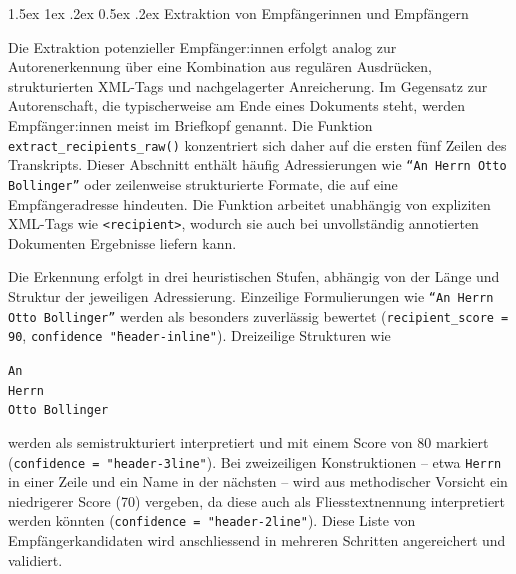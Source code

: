 \documentclass[12pt, a4paper, ngerman, bidi=default]{article}
\makeatletter
\newcommand{\code}[1]{\colorbox{VeryLightGray}{\texttt{#1}}} %
\let\oldparagraph\paragraph%
\renewcommand{\paragraph}{
    \@ifstar%
      \xxxParagraphStar%
      \xxxParagraphNoStar%
 }
\newcommand{\xxxParagraphStar}[1]{\oldparagraph*{#1}\mbox{}}
\newcommand{\xxxParagraphNoStar}[1]{\oldparagraph{#1}\mbox{}}
\renewcommand\paragraph{\@startsection{paragraph}{4}{0em}%
  {1.5ex \@plus1ex \@minus.2ex}%
  {0.5ex \@plus.2ex}%
  {\normalfont\normalsize\bfseries\itshape}}
\makeatother
\begin{document}
\paragraph{Extraktion von Empfängerinnen und Empfängern}

Die Extraktion potenzieller Empfänger:innen erfolgt analog zur Autorenerkennung über eine Kombination aus regulären Ausdrücken, strukturierten XML-Tags und nachgelagerter Anreicherung. Im Gegensatz zur Autorenschaft, die typischerweise am Ende eines Dokuments steht, werden Empfänger:innen meist im Briefkopf genannt. Die Funktion \code{extract\_recipients\_raw()} konzentriert sich daher auf die ersten fünf Zeilen des Transkripts. Dieser Abschnitt enthält häufig Adressierungen wie \texttt{\enquote{An Herrn Otto Bollinger}} oder zeilenweise strukturierte Formate, die auf eine Empfängeradresse hindeuten. Die Funktion arbeitet unabhängig von expliziten XML-Tags wie \code{<recipient>}, wodurch sie auch bei unvollständig annotierten Dokumenten Ergebnisse liefern kann.

Die Erkennung erfolgt in drei heuristischen Stufen, abhängig von der Länge und Struktur der jeweiligen Adressierung. Einzeilige Formulierungen wie \texttt{\enquote{An Herrn Otto Bollinger}} werden als besonders zuverlässig bewertet (\code{recipient\_score = 90}, \code{confidence \= "header-inline"}). Dreizeilige Strukturen wie 
\\ \begin{center}
\texttt{An\\Herrn\\Otto Bollinger}
\end{center}
\justifying werden als semistrukturiert interpretiert und mit einem Score von 80 markiert (\code{confidence = "header-3line"}). Bei zweizeiligen Konstruktionen – etwa \texttt{Herrn} in einer Zeile und ein Name in der nächsten – wird aus methodischer Vorsicht ein niedrigerer Score (70) vergeben, da diese auch als Fliesstextnennung interpretiert werden könnten (\code{confidence = "header-2line"}). Diese Liste von Empfängerkandidaten wird anschliessend in mehreren Schritten angereichert und validiert.
\end{document}
